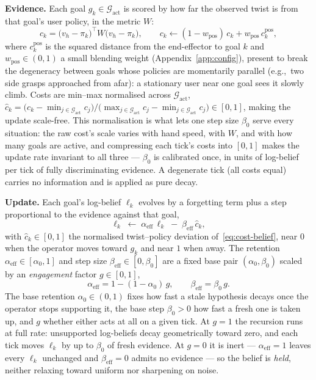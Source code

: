 \documentclass[12pt,a4paper,twoside,openright]{report}
\begin{document}
\textbf{Evidence.} Each goal $g_k \in \mathcal{G}_{\text{act}}$ is scored by how far the observed twist is from that goal's user policy, in the metric $W$:
\begin{equation}
c_k = \bigl(v_h - \pi_k\bigr)^{\top} W \bigl(v_h - \pi_k\bigr),
\qquad
c_k \leftarrow (1-w_{\text{pos}})\,c_k + w_{\text{pos}}\,c_k^{\text{pos}},
\label{eq:cost-belief}
\end{equation}
where $c_k^{\text{pos}}$ is the squared distance from the end-effector to goal $k$ and $w_{\text{pos}} \in (0,1)$ a small blending weight (Appendix~\ref{app:config}), present to break the degeneracy between goals whose policies are momentarily parallel (e.g.,\ two side grasps approached from afar): a stationary user near one goal sees it slowly climb. Costs are min--max normalised across $\mathcal{G}_{\text{act}}$,
$\hat{c}_k = \bigl(c_k - \min_{j \in \mathcal{G}_{\text{act}}} c_j\bigr)\big/\bigl(\max_{j \in \mathcal{G}_{\text{act}}} c_j - \min_{j \in \mathcal{G}_{\text{act}}} c_j\bigr) \in [0,1]$, making the update scale-free. This normalisation is what lets one step size $\beta_0$ serve every situation: the raw cost's scale varies with hand speed, with $W$, and with how many goals are active, and compressing each tick's costs into $[0,1]$ makes the update rate invariant to all three --- $\beta_0$ is calibrated once, in units of log-belief per tick of fully discriminating evidence. A degenerate tick (all costs equal) carries no information and is applied as pure decay.

\textbf{Update.} Each goal's log-belief $\ell_k$ evolves by a forgetting term plus a step proportional to the evidence against that goal,
\begin{equation}
\ell_k \;\leftarrow\; \alpha_{\text{eff}}\,\ell_k \;-\; \beta_{\text{eff}}\,\hat{c}_k,
\label{eq:beliefupdate}
\end{equation}
with $\hat{c}_k \in [0,1]$ the normalised twist--policy deviation of~\eqref{eq:cost-belief}, near $0$ when the operator moves toward $g_k$ and near $1$ when away. The retention $\alpha_{\text{eff}} \in [\alpha_0, 1]$ and step size $\beta_{\text{eff}} \in [0, \beta_0]$ are a fixed base pair $(\alpha_0, \beta_0)$ scaled by an \emph{engagement} factor $g \in [0,1]$,
\begin{equation}
\alpha_{\text{eff}} = 1 - (1 - \alpha_0)\,g,
\qquad
\beta_{\text{eff}} = \beta_0\, g.
\label{eq:effgains}
\end{equation}
The base retention $\alpha_0 \in (0,1)$ fixes how fast a stale hypothesis decays once the operator stops supporting it, the base step $\beta_0 > 0$ how fast a fresh one is taken up, and $g$ whether either acts at all on a given tick. At $g = 1$ the recursion runs at full rate: unsupported log-beliefs decay geometrically toward zero, and each tick moves $\ell_k$ by up to $\beta_0$ of fresh evidence. At $g = 0$ it is inert --- $\alpha_{\text{eff}} = 1$ leaves every $\ell_k$ unchanged and $\beta_{\text{eff}} = 0$ admits no evidence --- so the belief is \emph{held}, neither relaxing toward uniform nor sharpening on noise.
\end{document}
